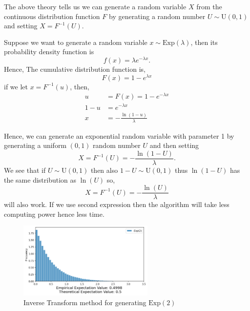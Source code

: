 The above theory tells us we can generate a random variable $X$ from the continuous distribution function  $F$ by generating a random number $U\sim \text{U}(0,1)$
and setting $X=F^{-1}(U)$.

\begin{example}
	\label{exponential distribution}
    Suppose we want to generate a random variable $x\sim \text{Exp}(\lambda)$, then its probability density function is
	\[
		f(x) = \lambda e^{-\lambda x}.
	\]
	Hence, The cumulative distribution function is,
	\[
		F(x) = 1-e^{\lambda x}
	\]
	if we let $x=F^{-1}(u)$, then,
	\begin{align*}
		u   & =F(x)=1-e^{-\lambda x}       \\
		1-u & = e ^{-\lambda x}            \\
		x   & = - \frac{\ln(1-u)}{\lambda}
	\end{align*}

	Hence, we can generate an exponential random variable with parameter 1 by generating a uniform $(0,1)$ random number $U$ and then setting
	\[
		X = F^{-1}(U) = -\frac{\ln(1-U)}{\lambda}.
	\]
    We see that if $U\sim \text{U}(0,1)$ then also $1-U\sim \text{U}(0,1)$ thus  $\ln(1-U)$ has the same distribution as  $\ln(U)$ so,
	\[
		X = F^{-1}(U) = -\frac{\ln(U)}{\lambda}
	\]
	will also work. If we use second expression then the algorithm will take less computing power hence less time.
	\begin{figure}[H]

		\centering
		\includegraphics[width=0.6\textwidth]{images/exp_ITA.png}
        \caption{Inverse Transform method for generating $\text{Exp}(2)$}
	\end{figure}
\end{example}
